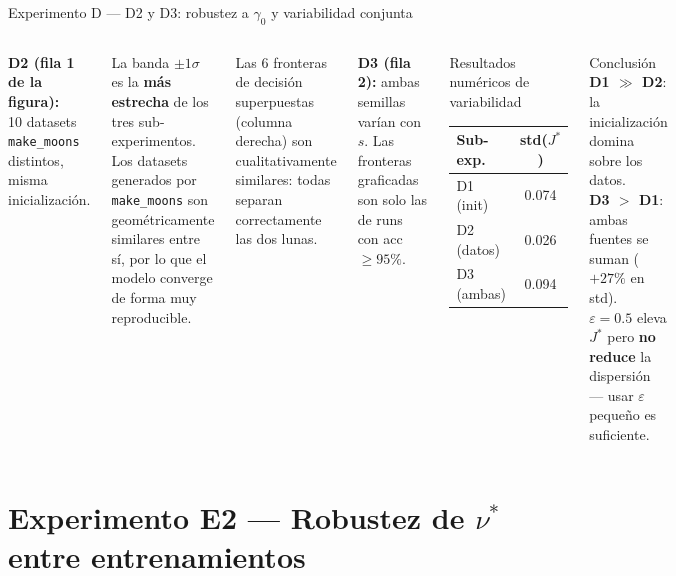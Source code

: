 \documentclass[10pt]{beamer}
\begin{document}
\begin{frame}{Experimento D — D2 y D3: robustez a $\gamma_0$ y variabilidad conjunta}

\begin{columns}

\textbf{D2 (fila 1 de la figura):}\\
10 datasets \texttt{make\_moons} distintos, misma inicialización.

\medskip
La banda $\pm 1\sigma$ es la \textbf{más estrecha} de los tres sub-experimentos. Los datasets generados por \texttt{make\_moons} son geométricamente similares entre sí, por lo que el modelo converge de forma muy reproducible.

Las 6 fronteras de decisión superpuestas (columna derecha) son cualitativamente similares: todas separan correctamente las dos lunas.

\bigskip
\textbf{D3 (fila 2):} ambas semillas varían con $s$. Las fronteras graficadas son solo las de runs con acc~$\geq 95\%$.

\begin{block}{Resultados numéricos de variabilidad}
  \begin{tabular}{lc}
    \toprule
    Sub-exp. & std($J^*$) \\
    \midrule
    D1 (init) & 0.074 \\
    D2 (datos) & 0.026 \\
    D3 (ambas) & 0.094 \\
    \bottomrule
  \end{tabular}
\end{block}

\begin{alertblock}{Conclusión}
  \textbf{D1 $\gg$ D2}: la inicialización domina sobre los datos.\\[4pt]
  \textbf{D3 $>$ D1}: ambas fuentes se suman ($+27\%$ en std).\\[4pt]
  $\varepsilon=0.5$ eleva $J^*$ pero \textbf{no reduce} la dispersión — usar $\varepsilon$ pequeño es suficiente.
\end{alertblock}
\end{columns}

\end{frame}

\section{Experimento E2 — Robustez de $\nu^*$ entre entrenamientos}
\end{document}
